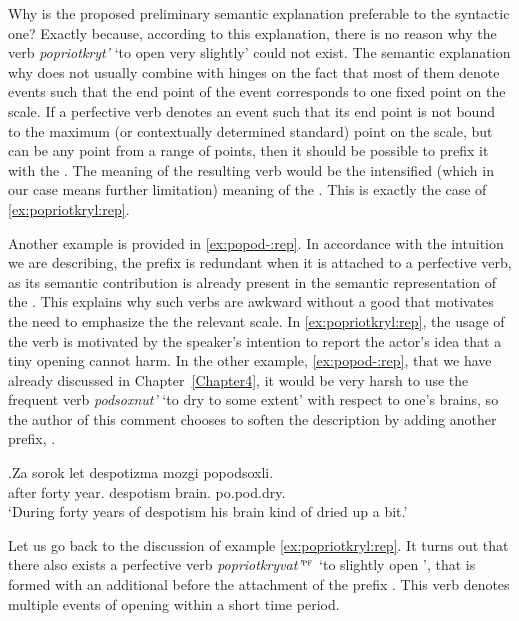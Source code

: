 Why is the proposed preliminary semantic explanation preferable to the syntactic one? Exactly because, according to this explanation, there is no reason why the verb \textit{popriotkryt'} `to open very slightly' could not exist. The semantic explanation why  does not usually combine with  hinges on the fact that most of them denote events such that the end point of the event corresponds to one fixed point on the scale. If a perfective verb denotes an event such that its end point is not bound to the maximum (or contextually determined standard) point on the scale, but can be any point from a range of points, then it should be possible to prefix it with the  . The meaning of the resulting verb would be the intensified (which in our case means further limitation) meaning of the . This is exactly the case of \ref{ex:popriotkryl:rep}.

Another example is provided in \ref{ex:popod-:rep}. In accordance with the intuition we are describing, the  prefix  is redundant when it is attached to a perfective verb, as its semantic contribution is already present in the semantic representation of the . This explains why such verbs are awkward without a good  that motivates the need to emphasize the  the relevant scale. In \ref{ex:popriotkryl:rep}, the usage of the verb is motivated by the speaker's intention to report the actor's idea that a tiny opening cannot harm. In the other example, \ref{ex:popod-:rep}, that we have already discussed in Chapter~\ref{Chapter4}, it would be very harsh to use the frequent verb \textit{podsoxnut'} `to dry to some extent' with respect to one's brains, so the author of this comment chooses to soften the description by adding another  prefix, . 

\exg.\label{ex:popod-:rep}Za sorok let despotizma mozgi popodsoxli.\\
after forty year. despotism brain. po.pod.dry.\\
\trans `During forty years of despotism his brain kind of dried up a bit.'\\

Let us go back to the discussion of example \ref{ex:popriotkryl:rep}. It turns out that there also exists a perfective verb \textit{popriotkryvat'}$^{\textsc{pf}}$ `to slightly open ', that is formed with an additional  before the attachment of the prefix . This verb denotes multiple events of opening within a short time period. 

